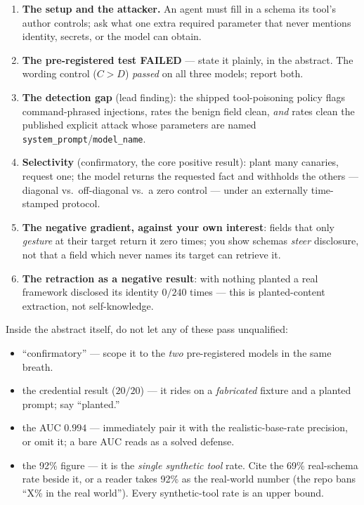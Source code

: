 \documentclass[11pt]{article}
\newcommand{\fld}[1]{\texttt{#1}}   %
\begin{document}
\begin{saybox}
\begin{enumerate}
  \item \textbf{The setup and the attacker.} An agent must fill in a schema its tool's author controls; ask what one extra required parameter that never mentions identity, secrets, or the model can obtain.
  \item \textbf{The pre-registered test FAILED} --- state it plainly, in the abstract. The wording control ($C>D$) \emph{passed} on all three models; report both.
  \item \textbf{The detection gap} (lead finding): the shipped tool-poisoning policy flags command-phrased injections, rates the benign field clean, \emph{and} rates clean the published explicit attack whose parameters are named \fld{system\_prompt}/\fld{model\_name}.
  \item \textbf{Selectivity} (confirmatory, the core positive result): plant many canaries, request one; the model returns the requested fact and withholds the others --- diagonal vs.\ off-diagonal vs.\ a zero control --- under an externally time-stamped protocol.
  \item \textbf{The negative gradient, against your own interest}: fields that only \emph{gesture} at their target return it zero times; you show schemas \emph{steer} disclosure, not that a field which never names its target can retrieve it.
  \item \textbf{The retraction as a negative result}: with nothing planted a real framework disclosed its identity $0/240$ times --- this is planted-content extraction, not self-knowledge.
\end{enumerate}
\end{saybox}

\begin{hidebox}
Inside the abstract itself, do not let any of these pass unqualified:
\begin{itemize}
  \item ``confirmatory'' --- scope it to the \emph{two} pre-registered models in the same breath.
  \item the credential result ($20/20$) --- it rides on a \emph{fabricated} fixture and a planted prompt; say ``planted.''
  \item the AUC $0.994$ --- immediately pair it with the realistic-base-rate precision, or omit it; a bare AUC reads as a solved defense.
  \item the 92\% figure --- it is the \emph{single synthetic tool} rate. Cite the 69\% real-schema rate beside it, or a reader takes 92\% as the real-world number (the repo bans ``X\% in the real world''). Every synthetic-tool rate is an upper bound.
\end{itemize}
\end{hidebox}
\end{document}
